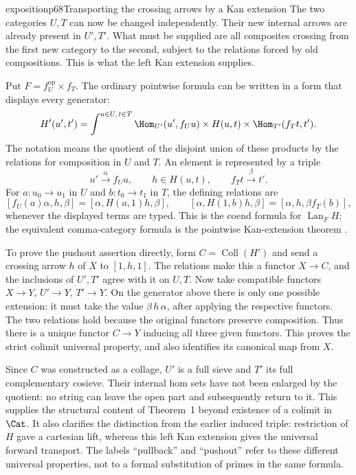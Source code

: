 \begin{dcomment}{exposition}{p68}{Transporting the crossing arrows by a Kan extension}
The two categories $U,T$ can now be changed independently. Their new internal arrows are already present in $U',T'$. What must be supplied are all composites crossing from the first new category to the second, subject to the relations forced by old compositions. This is what the left Kan extension supplies.

Put $F=f_U^{\mathrm{op}}\times f_T$. The ordinary pointwise formula can be written in a form that displays every generator:
\[
 H'(u',t')=
 \int^{u\in U,\,t\in T}
 \Hom_{U'}(u',f_Uu)\times H(u,t)
                  \times\Hom_{T'}(f_Tt,t').
\]
The notation means the quotient of the disjoint union of these products by the relations for composition in $U$ and $T$. An element is represented by a triple
\[
 u'\xrightarrow{\alpha}f_Uu,\qquad
 h\in H(u,t),\qquad f_Tt\xrightarrow{\beta}t'.
\]
For $a:u_0\to u_1$ in $U$ and $b:t_0\to t_1$ in $T$, the defining relations are
\[
 [f_U(a)\alpha,h,\beta]=[\alpha,H(a,1)h,\beta],
 \qquad
 [\alpha,H(1,b)h,\beta]=[\alpha,h,\beta f_T(b)],
\]
whenever the displayed terms are typed. This is the coend formula for $\operatorname{Lan}_F H$; the equivalent comma-category formula is the pointwise Kan-extension theorem \citep[Theorem~6.2.1]{Riehl2016}.

To prove the pushout assertion directly, form $C=\operatorname{Coll}(H')$ and send a crossing arrow $h$ of $X$ to $[1,h,1]$. The relations make this a functor $X\to C$, and the inclusions of $U',T'$ agree with it on $U,T$. Now take compatible functors $X\to Y$, $U'\to Y$, $T'\to Y$. On the generator above there is only one possible extension: it must take the value $\beta\,h\,\alpha$, after applying the respective functors. The two relations hold because the original functors preserve composition. Thus there is a unique functor $C\to Y$ inducing all three given functors. This proves the strict colimit universal property, and also identifies its canonical map from $X$.

Since $C$ was constructed as a collage, $U'$ is a full sieve and $T'$ its full complementary cosieve. Their internal hom sets have not been enlarged by the quotient: no string can leave the open part and subsequently return to it. This supplies the structural content of Theorem~1 beyond existence of a colimit in $\Cat$. It also clarifies the distinction from the earlier induced triple: restriction of $H$ gave a cartesian lift, whereas this left Kan extension gives the universal forward transport. The labels ``pullback'' and ``pushout'' refer to these different universal properties, not to a formal substitution of primes in the same formula.
\end{dcomment}

